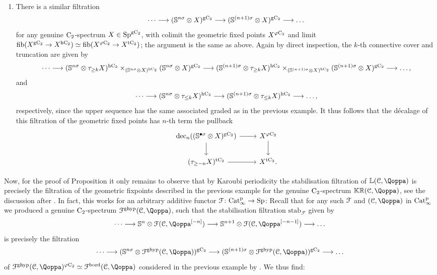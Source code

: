 \begin{example}
\begin{enumerate}
Thus we learn that the décalage of the Tate filtration is given by the Tate construction of the Whitehead filtration:
\[
\dots \longrightarrow (\tau_{\geq -n+1} X)^\tC \longrightarrow (\tau_{\geq -n} X)^\tC \longrightarrow \dots
\]
\item There is a similar filtration 
\[
\dots \longrightarrow (\mathbb{S}^{n\sigma} \otimes X)^{\mathrm{g}\mathrm{C_2}} \longrightarrow (\mathbb{S}^{(n+1)\sigma} \otimes X)^{\mathrm{g}\mathrm{C_2}} \longrightarrow \dots
\]
for any genuine $\mathrm{C_2}$-spectrum $X \in \mathrm{Sp}^{\mathrm{g}\mathrm{C_2}}$, with colimit the geometric fixed points $X^{\varphi\mathrm{C_2}}$ and limit $\operatorname{fib}(X^{\mathrm{g}\mathrm{C_2}} \rightarrow X^{\mathrm{h}\mathrm{C_2}}) \simeq \operatorname{fib}(X^{\varphi\mathrm{C_2}} \rightarrow X^{\mathrm{t}\mathrm{C_2}})$; the argument is the same as above. Again by direct inspection, the $k$-th connective cover and truncation are given by 
\[
\dots \longrightarrow (\mathbb{S}^{n\sigma} \otimes \tau_{\geq k} X)^{\mathrm{h}\mathrm{C_2}} \times_{(\mathbb{S}^{n\sigma} \otimes X)^{\mathrm{h}\mathrm{C_2}}} (\mathbb{S}^{n\sigma} \otimes X)^{\mathrm{g}\mathrm{C_2}} \longrightarrow (\mathbb{S}^{(n+1)\sigma} \otimes \tau_{\geq k} X)^{\mathrm{h}\mathrm{C_2}} \times_{(\mathbb{S}^{(n+1)\sigma} \otimes X)^{\mathrm{h}\mathrm{C_2}}} (\mathbb{S}^{(n+1)\sigma} \otimes X)^{\mathrm{g}\mathrm{C_2}} \longrightarrow \dots,
\]
and
\[
\dots \longrightarrow (\mathbb{S}^{n\sigma} \otimes \tau_{\leq k} X)^{\mathrm{h}\mathrm{C_2}} \longrightarrow (\mathbb{S}^{(n+1)\sigma} \otimes \tau_{\leq k} X)^{\mathrm{h}\mathrm{C_2}} \longrightarrow \dots,
\]
respectively, since the upper sequence has the same associated graded as in the previous example. It thus follows that the décalage of this filtration of the geometric fixed points has $n$-th term the pullback
\[
\begin{tikzcd}
\dec_n((\SS^{\bullet\sigma} \otimes X)^\gC) \ar[r] \ar[d] & X^\geofix \ar[d] \\
(\tau_{\geq -n} X)^\tC \ar[r] & X^\tC.
\end{tikzcd}
\]
\end{enumerate}
\end{example}
 
Now, for the proof of Proposition  it only remains to observe that by Karoubi periodicity the stabilisation filtration of $\KL(\C,\QF)$ is precisely the filtration of the geometric fixpoints described in the previous example for the genuine $\mathrm{C_2}$-spectrum $\KKR(\C,\QF)$, see the discussion after . In fact, this works for an arbitrary additive functor $\mathcal{F} \colon \mathrm{Cat}^{\mathrm p}_\infty \rightarrow \mathrm{Sp}$: Recall that for any such $\mathcal{F}$ and $(\C,\QF)$ in $\mathrm{Cat}^{\mathrm p}_\infty$ we produced a genuine $\mathrm{C_2}$-spectrum $\F^\ghyp(\C,\QF)$, such that the stabilisation filtration $\mathrm{stab}_\mathcal F$ given by
\[
\dots \longrightarrow \SS^{n} \otimes \F(\C,\QF\qshift{-n}) \longrightarrow \SS^{n+1} \otimes \F(\C,\QF\qshift{-n-1}) \longrightarrow \dots
\]
is precisely the filtration
\[
\dots \longrightarrow (\SS^{n\sigma} \otimes \F^\ghyp(\C,\QF))^\gC \longrightarrow (\SS^{(n+1)\sigma} \otimes \F^\ghyp(\C,\QF))^\gC \longrightarrow \dots
\]
of $\F^\ghyp(\C,\QF)^\geofix \simeq \F^\bord(\C,\QF)$ considered in the previous example by . We thus find:

